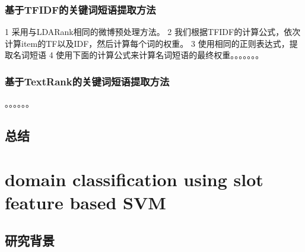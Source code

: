 \documentclass[master]{njuthesis}
\begin{document}
\subsection{基于TFIDF的关键词短语提取方法}

    1 采用与LDARank相同的微博预处理方法。
    2 我们根据TFIDF的计算公式，依次计算item的TF以及IDF，然后计算每个词的权重。
    3 使用相同的正则表达式，提取名词短语
    4 使用下面的计算公式来计算名词短语的最终权重。。。。。。。

\subsection{基于TextRank的关键词短语提取方法}
    。。。。。。

\section{总结}

\chapter{domain classification using slot feature based SVM}\label{chapter_smallworld}

\section{研究背景}
\end{document}
